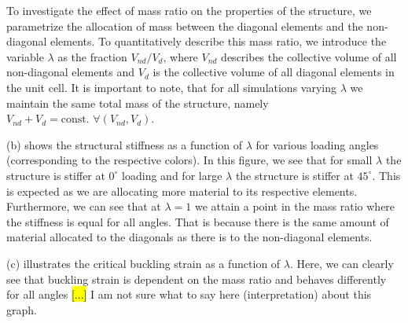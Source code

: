\documentclass[9pt,twocolumn,twoside]{fernandes_paper}
\newcommand{\mf}[1]{\colorbox{blue!10}{\color{color3}#1}}
\begin{document}


To investigate the effect of mass ratio on the properties of the structure, we parametrize the allocation of mass between the diagonal elements and the non-diagonal elements. To quantitatively describe this mass ratio, we introduce the variable $\lambda$ as the fraction $V_{nd}/V_d$, where $V_{nd}$ describes the collective volume of all non-diagonal elements and $V_d$ is the collective volume of all diagonal elements in the unit cell. It is important to note, that for all simulations varying $\lambda$ we maintain the same total mass of the structure, namely $V_{nd}+V_d=\mbox{const. } \forall (V_{nd},V_d)$. 

(b) shows the structural stiffness as a function of $\lambda$ for various loading angles (corresponding to the respective colors). In this figure, we see that for small $\lambda$ the structure is stiffer at $0^\circ$ loading and for large $\lambda$ the structure is stiffer at $45^\circ$. This is expected as we are allocating more material to its respective elements. Furthermore, we can see that at $\lambda=1$ we attain a point in the mass ratio where the stiffness is equal for all angles. That is because there is the same amount of material allocated to the diagonals as there is to the non-diagonal elements.

(c) illustrates the critical buckling strain as a function of $\lambda$. Here, we can clearly see that buckling strain is dependent on the mass ratio and behaves differently for all angles \hl{[...]} \mf{I am not sure what to say here (interpretation) about this graph.}


\end{document}
